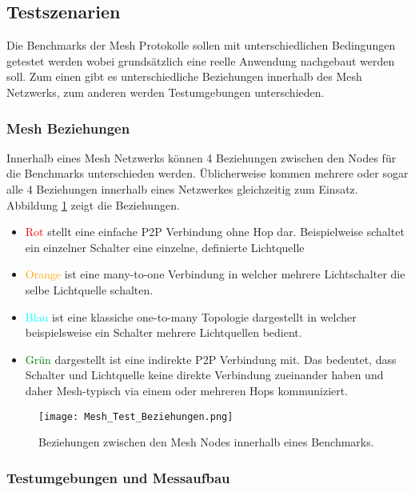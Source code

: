 \subsection{Testszenarien}\label{subsec:TestszenarienMesh}

Die Benchmarks der Mesh Protokolle sollen mit unterschiedlichen Bedingungen getestet werden wobei grundsätzlich eine reelle Anwendung nachgebaut werden soll. Zum einen gibt es unterschiedliche Beziehungen innerhalb des Mesh Netzwerks, zum anderen werden Testumgebungen unterschieden.

\subsubsection{Mesh Beziehungen}\label{subsubsec:MeshBeziehungen}

Innerhalb eines Mesh Netzwerks können 4 Beziehungen zwischen den Nodes für die Benchmarks unterschieden werden. Üblicherweise kommen mehrere oder sogar alle 4 Beziehungen innerhalb eines Netzwerkes gleichzeitig zum Einsatz. Abbildung \ref{fig:MeshTestBeziehungen} zeigt die Beziehungen.

\begin{itemize}
 	\item \textcolor{red}{Rot} stellt eine einfache P2P Verbindung ohne Hop dar. Beispielweise schaltet ein einzelner Schalter eine einzelne, definierte Lichtquelle
 	\item \textcolor{orange}{Orange} ist eine many-to-one Verbindung in welcher mehrere Lichtschalter die selbe Lichtquelle schalten.
 	\item \textcolor{cyan}{Blau} ist eine klassiche one-to-many Topologie dargestellt in welcher beispielsweise ein Schalter mehrere Lichtquellen bedient.
 	 \item \textcolor{green}{Grün} dargestellt ist eine indirekte P2P Verbindung mit. Das bedeutet, dass Schalter und Lichtquelle keine direkte Verbindung zueinander haben und daher Mesh-typisch via einem oder mehreren Hops kommuniziert.
\end{itemize}


\begin{figure}[H]
	\centering
	\texttt{[image: Mesh\_Test\_Beziehungen.png]}
	\caption{Beziehungen zwischen den Mesh Nodes innerhalb eines Benchmarks.}\label{fig:MeshTestBeziehungen}
\end{figure}


\subsubsection{Testumgebungen und Messaufbau}\label{subsubsec:TestumgebungenundMessaufbau}

